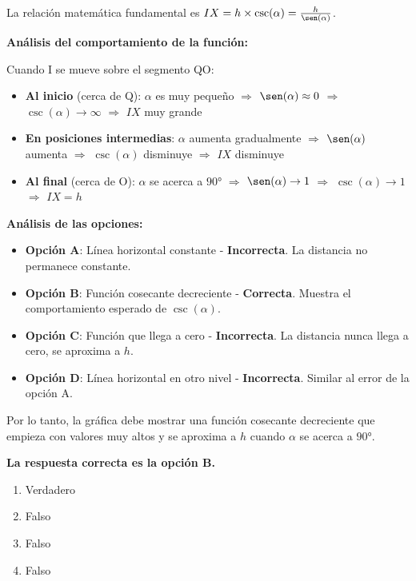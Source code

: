 \documentclass[10pt,a4paper]{article}
\makeatletter
\newenvironment{solution}{\comment}{\endcomment}
\newenvironment{answerlist}{\renewcommand{\labelenumii}{(\alph{enumii})}\begin{enumerate}}{\end{enumerate}}
\newcommand{\exname}[1]{\def\@exname{#1}}
\newcommand{\extype}[1]{\def\@extype{#1}}
\newcommand{\exsolution}[1]{\def\@exsolution{#1}}
\newcommand{\exshuffle}[1]{\def\@exshuffle{#1}}
\newcommand{\exsection}[1]{\def\@exsection{#1}}
\makeatother
\begin{document}
\begin{enumerate}
\begin{solution}

La relación matemática fundamental es $IX = h \times \csc(\alpha) = \frac{h}{\sen(\alpha)}$.

\textbf{Análisis del comportamiento de la función:}

Cuando I se mueve sobre el segmento QO:

\begin{itemize}
\item \textbf{Al inicio} (cerca de Q): $\alpha$ es muy pequeño $\Rightarrow$ $\sen(\alpha) \approx 0$ $\Rightarrow$ $\csc(\alpha) \to \infty$ $\Rightarrow$ $IX$ muy grande

\item \textbf{En posiciones intermedias}: $\alpha$ aumenta gradualmente $\Rightarrow$ $\sen(\alpha)$ aumenta $\Rightarrow$ $\csc(\alpha)$ disminuye $\Rightarrow$ $IX$ disminuye

\item \textbf{Al final} (cerca de O): $\alpha$ se acerca a $90°$ $\Rightarrow$ $\sen(\alpha) \to 1$ $\Rightarrow$ $\csc(\alpha) \to 1$ $\Rightarrow$ $IX = h$
\end{itemize}

\textbf{Análisis de las opciones:}

\begin{itemize}
\item \textbf{Opción A}: Línea horizontal constante - \textbf{Incorrecta}. La distancia no permanece constante.
\item \textbf{Opción B}: Función cosecante decreciente - \textbf{Correcta}. Muestra el comportamiento esperado de $\csc(\alpha)$.
\item \textbf{Opción C}: Función que llega a cero - \textbf{Incorrecta}. La distancia nunca llega a cero, se aproxima a $h$.
\item \textbf{Opción D}: Línea horizontal en otro nivel - \textbf{Incorrecta}. Similar al error de la opción A.
\end{itemize}

Por lo tanto, la gráfica debe mostrar una función cosecante decreciente que empieza con valores muy altos y se aproxima a $h$ cuando $\alpha$ se acerca a $90°$.

\textbf{La respuesta correcta es la opción B.}

\begin{answerlist}
  \item Verdadero
  \item Falso
  \item Falso
  \item Falso
\end{answerlist}
\end{solution}

\exname{Trigonometría Punto Móvil}
\extype{schoice}
\exsolution{1000}
\exshuffle{TRUE}
\exsection{Geometría Métrica}

\end{enumerate}
\end{document}
